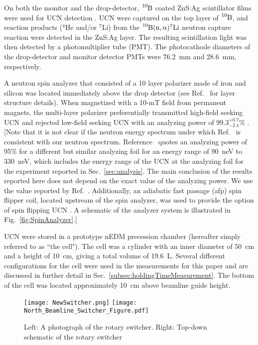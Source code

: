 On both the monitor and the drop-detector, $\ce{^{10}B}$ coated ZnS:Ag scintillator films were used for UCN detection \cite{jeph_b10_2011}. UCN were captured on the top layer of $\ce{^{10}B}$, and reaction products ($^4$He and/or $^7$Li) from the $\ce{^{10}B}(\text{n},\alpha)^7\text{Li}$ neutron capture reaction were detected in the ZnS:Ag layer. The resulting scintillation light was then detected by a photomultiplier tube (PMT). The photocathode diameters of the drop-detector and monitor detector PMTs were \qty{76.2}{\mm} and \qty{28.6}{\mm}, respectively.

A neutron spin analyzer that consisted of a 10 layer polarizer made of iron and silicon was located immediately above the drop detector (see Ref.~\cite{ThorstenThesis} for layer structure details). When magnetized with a 10-mT field from permanent magnets, the multi-layer polarizer preferentially transmitted high-field seeking UCN and rejected low-field seeking UCN with an analyzing power of $99.3^{+0.7}_{-2.4}\%$ \cite{ThorstenThesis}. [Note that it is not clear if the neutron energy spectrum under which Ref.~\cite{ThorstenThesis} is consistent with our neutron spectrum. Reference~\cite{afach_device_2015} quotes an analyzing power of 95\% for a different but similar analyzing foil for an energy range of 90~neV to 330~neV, which includes the energy range of the UCN at the analyzing foil for the experiment reported in Sec.~\ref{sec:analysis}. The main conclusion of the results reported here does not depend on the exact value of the analyzing power. We use the value reported by Ref.~\cite{ThorstenThesis}.   Additionally, an adiabatic fast passage (\acrshort{afp}) spin flipper coil, located upstream of the spin analyzer, was used to provide the option of spin flipping UCN \cite{holley_afp_2012}. A schematic of the analyzer system is illustrated in Fig.~\ref{fig:SpinAnalyzer}.]

UCN were stored in a prototype nEDM precession chamber (hereafter simply referred to as ``the cell"). The cell was a cylinder with an inner diameter of \qty{50}{\cm} and a height of \qty{10}{\cm}, giving a total volume of \qty{19.6}{\liter}. Several different configurations for the cell were used in the measurements for this paper and are discussed in further detail in Sec.~\ref{subsec:holdingTimeMeasurement}. The bottom of the cell was located approximately \qty{10}{\cm} above beamline guide height.

\begin{figure}[htp]
    \centering
    \texttt{[image: NewSwitcher.png]}
    \hspace{1em}
    \texttt{[image: North\_Beamline\_Switcher\_Figure.pdf]}
    \caption[Photograph and schematic of rotary switcher]{Left: A photograph of the rotary switcher. Right: Top-down schematic of the rotary switcher}\label{fig:NewSwitcher}
\end{figure}


